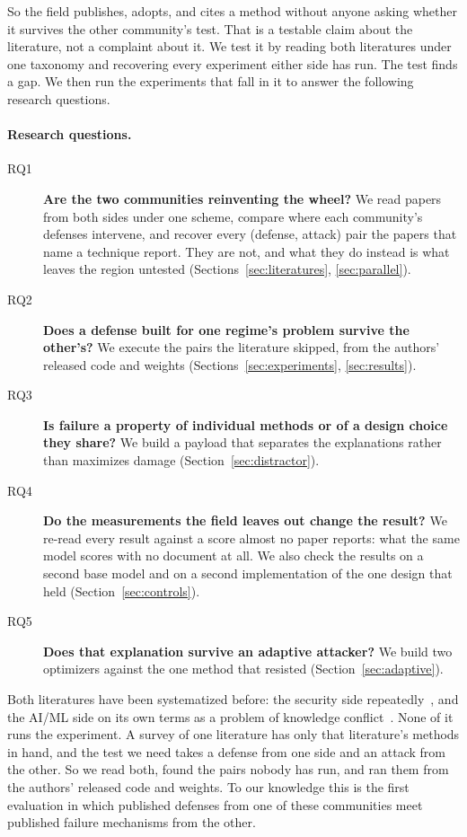 So the field publishes, adopts, and cites a method without anyone asking
whether it survives the other community's test. That is a testable claim about the literature, not a complaint about it. We
test it by reading both literatures under one taxonomy and recovering every
experiment either side has run. The test finds a gap. We then run the
experiments that fall in it to answer the following research questions.

\paragraph{Research questions.}
\begin{description}
\item[RQ1] \textbf{Are the two communities reinventing the wheel?} We read
  \NCorpus{} papers from both sides under one scheme, compare where each
  community's defenses intervene, and recover every (defense, attack) pair
  the \NAnalysed{} papers that name a technique report. They are not, and
  what they do instead is what leaves the region untested
  (Sections~\ref{sec:literatures}, \ref{sec:parallel}).
\item[RQ2] \textbf{Does a defense built for one regime's problem survive
  the other's?} We execute the pairs the literature skipped, from the
  authors' released code and weights
  (Sections~\ref{sec:experiments}, \ref{sec:results}).
\item[RQ3] \textbf{Is failure a property of individual methods or of a
  design choice they share?} We build a payload that separates the
  explanations rather than maximizes damage
  (Section~\ref{sec:distractor}).
\item[RQ4] \textbf{Do the measurements the field leaves out change the
  result?} We re-read every result against a score almost no paper
  reports: what the same model scores with no document at all. We also check
  the results on a second base model and on a second implementation of the
  one design that held (Section~\ref{sec:controls}).
\item[RQ5] \textbf{Does that explanation survive an adaptive attacker?} We
  build two optimizers against the one method that resisted
  (Section~\ref{sec:adaptive}).
\end{description}

Both literatures have been systematized before: the security side
repeatedly~\cite{dehghantanha-2026-sok,chu-2026-systematic,jiang-2026-sok},
and the AI/ML side on its own terms as a problem of knowledge
conflict~\cite{xu-2024-knowledge}. None of it runs the experiment. A
survey of one literature has only that literature's methods in hand, and the
test we need takes a defense from one side and an attack from the other. So we
read both, found the pairs nobody has run, and ran them from the authors'
released code and weights. To our knowledge this is the first evaluation
in which published defenses from one of these communities meet published
failure mechanisms from the other.

